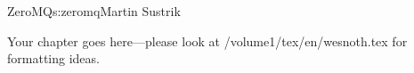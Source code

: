 \begin{aosachapter}{ZeroMQ}{s:zeromq}{Martin Sustrik}

Your chapter goes here---please look at /volume1/tex/en/wesnoth.tex for 
formatting ideas.

\end{aosachapter}
